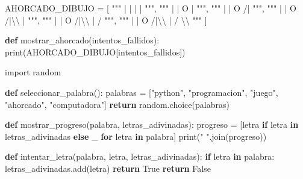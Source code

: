 \documentclass[
  a4paper,
  DIV=11,
  numbers=noendperiod,
  onepage,
  openany]{scrreprt}
\newenvironment{Shaded}{\begin{snugshade}}{\end{snugshade}}
\newcommand{\BuiltInTok}[1]{\textcolor[rgb]{0.00,0.23,0.31}{#1}}
\newcommand{\CharTok}[1]{\textcolor[rgb]{0.13,0.47,0.30}{#1}}
\newcommand{\ControlFlowTok}[1]{\textcolor[rgb]{0.00,0.23,0.31}{\textbf{#1}}}
\newcommand{\ImportTok}[1]{\textcolor[rgb]{0.00,0.46,0.62}{#1}}
\newcommand{\KeywordTok}[1]{\textcolor[rgb]{0.00,0.23,0.31}{\textbf{#1}}}
\newcommand{\NormalTok}[1]{\textcolor[rgb]{0.00,0.23,0.31}{#1}}
\newcommand{\OperatorTok}[1]{\textcolor[rgb]{0.37,0.37,0.37}{#1}}
\newcommand{\StringTok}[1]{\textcolor[rgb]{0.13,0.47,0.30}{#1}}
\newcommand{\VariableTok}[1]{\textcolor[rgb]{0.07,0.07,0.07}{#1}}
\begin{document}
\begin{Shaded}
\begin{Highlighting}[]
\NormalTok{AHORCADO\_DIBUJO }\OperatorTok{=}\NormalTok{ [}
    \StringTok{"""}
\StringTok{       |}
\StringTok{       |}
\StringTok{       |}
\StringTok{       |}
\StringTok{    """}\NormalTok{,}
    \StringTok{"""}
\StringTok{       |}
\StringTok{       |}
\StringTok{       O}
\StringTok{       |}
\StringTok{    """}\NormalTok{,}
    \StringTok{"""}
\StringTok{       |}
\StringTok{       |}
\StringTok{       O}
\StringTok{      /|}
\StringTok{    """}\NormalTok{,}
    \StringTok{"""}
\StringTok{       |}
\StringTok{       |}
\StringTok{       O}
\StringTok{      /|}\CharTok{\textbackslash{}\textbackslash{}}
\StringTok{       |}
\StringTok{    """}\NormalTok{,}
    \StringTok{"""}
\StringTok{       |}
\StringTok{       |}
\StringTok{       O}
\StringTok{      /|}\CharTok{\textbackslash{}\textbackslash{}}
\StringTok{       |}
\StringTok{      /}
\StringTok{    """}\NormalTok{,}
    \StringTok{"""}
\StringTok{       |}
\StringTok{       |}
\StringTok{       O}
\StringTok{      /|}\CharTok{\textbackslash{}\textbackslash{}}
\StringTok{       |}
\StringTok{      / }\CharTok{\textbackslash{}\textbackslash{}}
\StringTok{    """}
\NormalTok{]}

\KeywordTok{def}\NormalTok{ mostrar\_ahorcado(intentos\_fallidos):}
    \BuiltInTok{print}\NormalTok{(AHORCADO\_DIBUJO[intentos\_fallidos])}

\ImportTok{import}\NormalTok{ random}

\KeywordTok{def}\NormalTok{ seleccionar\_palabra():}
\NormalTok{    palabras }\OperatorTok{=}\NormalTok{ [}\StringTok{"python"}\NormalTok{, }\StringTok{"programacion"}\NormalTok{, }\StringTok{"juego"}\NormalTok{, }\StringTok{"ahorcado"}\NormalTok{, }\StringTok{"computadora"}\NormalTok{]}
    \ControlFlowTok{return}\NormalTok{ random.choice(palabras)}

\KeywordTok{def}\NormalTok{ mostrar\_progreso(palabra, letras\_adivinadas):}
\NormalTok{    progreso }\OperatorTok{=}\NormalTok{ [letra }\ControlFlowTok{if}\NormalTok{ letra }\KeywordTok{in}\NormalTok{ letras\_adivinadas }\ControlFlowTok{else} \StringTok{\textquotesingle{}\_\textquotesingle{}} \ControlFlowTok{for}\NormalTok{ letra }\KeywordTok{in}\NormalTok{ palabra]}
    \BuiltInTok{print}\NormalTok{(}\StringTok{" "}\NormalTok{.join(progreso))}

\KeywordTok{def}\NormalTok{ intentar\_letra(palabra, letra, letras\_adivinadas):}
    \ControlFlowTok{if}\NormalTok{ letra }\KeywordTok{in}\NormalTok{ palabra:}
\NormalTok{        letras\_adivinadas.add(letra)}
        \ControlFlowTok{return} \VariableTok{True}
    \ControlFlowTok{return} \VariableTok{False}


\end{Highlighting}
\end{Shaded}
\end{document}
